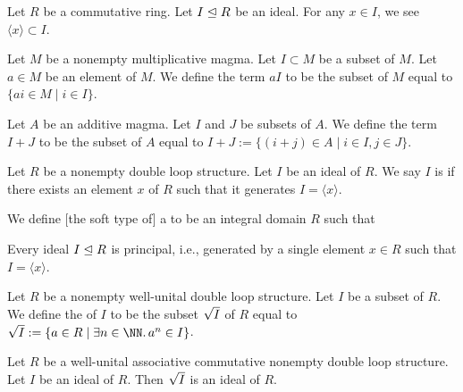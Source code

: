 \begin{theorem}
Let $R$ be a commutative ring.
Let $I\mathrel{\trianglelefteq} R$ be an ideal.
For any $x\in I$, we see $\langle x\rangle\subset I$.
\end{theorem}

\begin{definition}
Let $M$ be a nonempty multiplicative magma.
Let $I\subset M$ be a subset of $M$.
Let $a\in M$ be an element of $M$.
We define the term $aI$ to be the subset of $M$ equal to $\{ai\in M\mid i\in I\}$.
\end{definition}

\begin{definition}
Let $A$ be an additive magma.
Let $I$ and $J$ be subsets of $A$.
We define the term $I+J$ to be the subset of $A$ equal to
$I+J:=\{(i+j)\in A\mid i\in I, j\in J\}$.
\end{definition}

\begin{definition}
Let $R$ be a nonempty double loop structure.
Let $I$ be an ideal of $R$.
We say $I$ is  if there exists an element $x$ of $R$
such that it generates $I = \langle x\rangle$.
\end{definition}

\begin{definition}
We define [the soft type of] a  to be
an integral domain $R$ such that
\begin{itemize}
 Every ideal
$I\mathrel{\trianglelefteq} R$ is principal, i.e., generated by a single element $x\in R$
such that $I=\langle x\rangle$.
\end{itemize}
\end{definition}

\begin{definition}
Let $R$ be a nonempty well-unital double loop structure.
Let $I$ be a subset of $R$.
We define the  of $I$ to be the subset $\sqrt{I}$
of $R$ equal to $\Radical{I}:=\{a\in R\mid\exists n\in\NN\ldotp a^{n}\in I\}$.
\end{definition}

\begin{theorem}
Let $R$ be a well-unital associative commutative nonempty double loop structure.
Let $I$ be an ideal of $R$.
Then $\sqrt{I}$ is an ideal of $R$.
\end{theorem}

